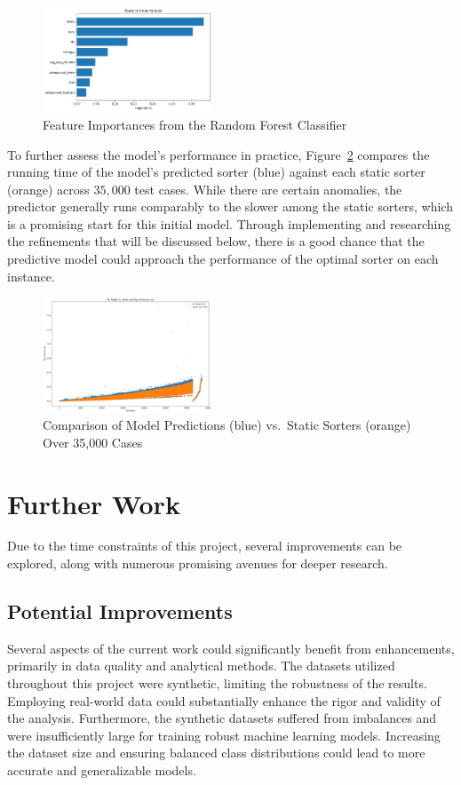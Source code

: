 \documentclass[twocolumn]{article}
\begin{document}
\begin{figure}[htbp]
  \centering
  \includegraphics[width=0.45\textwidth]{../Implementation/figures/feature_importances.png}
  \caption{Feature Importances from the Random Forest Classifier}
  \label{fig:features}
\end{figure}

To further assess the model's performance in practice, Figure~\ref{fig:cases} compares the 
running time of the model's predicted sorter (blue) against each static sorter (orange) 
across $35{,}000$ test cases. While there are certain anomalies, the predictor generally 
runs comparably to the slower among the static sorters, which is a promising start for this initial 
model. Through implementing and researching the refinements that will be discussed below, there is a good chance that the predictive model could 
approach the performance of the optimal sorter on each instance.

\begin{figure}[htbp]
  \centering
  \includegraphics[width=0.45\textwidth]{../Implementation/figures/35000cases.png}
  \caption{Comparison of Model Predictions (blue) vs.\ Static Sorters (orange) Over 35,000 Cases}
  \label{fig:cases}
\end{figure}

\section{Further Work}
Due to the time constraints of this project, several improvements can be explored, along with numerous promising avenues for deeper research.

\subsection{Potential Improvements}
Several aspects of the current work could significantly benefit from enhancements, primarily in data quality and analytical methods. The datasets utilized throughout this project were synthetic, limiting the robustness of the results. Employing real-world data could substantially enhance the rigor and validity of the analysis. Furthermore, the synthetic datasets suffered from imbalances and were insufficiently large for training robust machine learning models. Increasing the dataset size and ensuring balanced class distributions could lead to more accurate and generalizable models.
\end{document}

